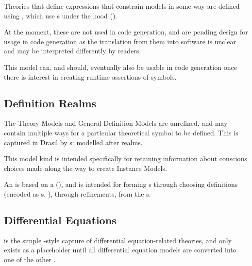 \currentConstraintSetHaskell{}

Theories that define expressions that constrain models in some way are defined
using \EquationalConstraints{}, which use \ConstraintSet{}s under the hood
().
	
At the moment, these are not used in code generation, and are pending design for
usage in code generation as the translation from them into software is unclear
and may be interpreted differently by readers.

This model can, and should, eventually also be usable in code generation once
there is interest in creating runtime assertions of symbols.


\subsection{Definition Realms}

\currentDefiningExprHaskell{}

\currentMultiDefnHaskell{}

The Theory Models and General Definition Models are unrefined, and may contain
multiple ways for a particular theoretical symbol to be defined. This is
captured in Drasil by \EquationalRealm{}s: modelled after realms.

This model kind is intended specifically for retaining information about
conscious choices made along the way to create Instance Models.

An \EquationalRealm{} is based on a \MultiDefn{}
(), and is intended for forming \QDefinition{}s
through choosing definitions (encoded as \DefiningExpr{}s,
), through refinements, from the \MultiDefn{}s.


\subsection{Differential Equations}

\DEModel{} is the simple \RelationConcept{}-style capture of differential
equation-related theories, and only exists as a placeholder until all
differential equation models are converted into one of the other \ModelKinds{}.

